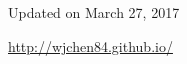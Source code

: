 \documentclass{res}
\begin{document}
\begin{resume}
%

\vspace{0.3in}
\centerline{\footnotesize Updated on March 27, 2017}
\centerline{\footnotesize \url{http://wjchen84.github.io/}}

\end{resume}
\end{document}

